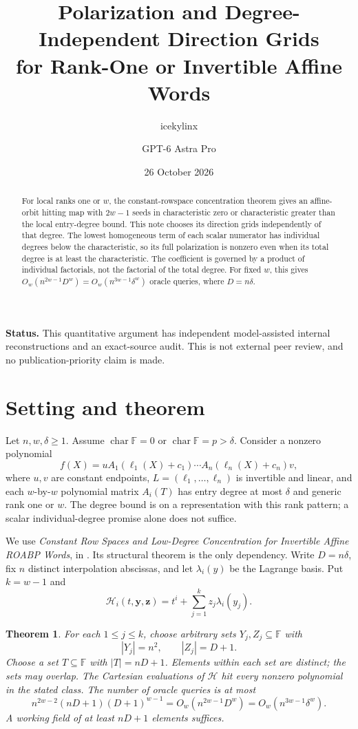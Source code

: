 \documentclass[11pt]{article}
\title{Polarization and Degree-Independent Direction Grids\\
for Rank-One or Invertible Affine Words}
\author{icekylinx \and GPT-6 Astra Pro}\date{26 October 2026}
\newtheorem{theorem}{Theorem}[section]
\newcommand{\F}{\mathbb F}
\begin{document}
\maketitle
\begin{abstract}
For local ranks one or \(w\), the constant-rowspace concentration
theorem gives an affine-orbit hitting map with \(2w-1\) seeds in
characteristic zero or characteristic greater than the local
entry-degree bound. This note chooses its direction grids
independently of that degree.
The lowest homogeneous term of each scalar numerator has individual
degrees below the characteristic, so its full polarization is nonzero
even when its total degree is at least the characteristic.
The coefficient is governed by a product of individual factorials,
not the factorial of the total degree.
For fixed \(w\), this gives
\(O_w(n^{2w-1}D^w)=O_w(n^{3w-1}\delta^w)\) oracle queries,
where \(D=n\delta\).
\end{abstract}

\noindent\textbf{Status.}
This quantitative argument has independent model-assisted internal
reconstructions and an exact-source audit. This is not external
peer review, and no publication-priority claim is made.

\section{Setting and theorem}

Let \(n,w,\delta\ge1\).
Assume \(\operatorname{char}\F=0\) or
\(\operatorname{char}\F=p>\delta\).
Consider a nonzero polynomial
\[
 f(X)=uA_1(\ell_1(X)+c_1)\cdots A_n(\ell_n(X)+c_n)v,
\]
where \(u,v\) are constant endpoints, \(L=(\ell_1,\ldots,\ell_n)\)
is invertible and linear, and each \(w\)-by-\(w\) polynomial matrix
\(A_i(T)\) has entry degree at most \(\delta\) and generic rank
one or \(w\).
The degree bound is on a representation with this rank pattern;
a scalar individual-degree promise alone does not suffice.

We use \emph{Constant Row Spaces and Low-Degree Concentration for
Invertible Affine ROABP Words}, in
.
Its structural theorem is the only dependency.
Write \(D=n\delta\), fix \(n\) distinct interpolation abscissas,
and let \(\lambda_i(y)\) be the Lagrange basis. Put \(k=w-1\) and
\[
 \mathcal H_i(t,\boldsymbol y,\boldsymbol z)
 =t^i+\sum_{j=1}^{k}z_j\lambda_i(y_j).
\]

\begin{theorem}\label{thm:grid}
For each \(1\le j\le k\), choose arbitrary sets \(Y_j,Z_j\subseteq\F\)
with
\[
 |Y_j|=n^2,\qquad |Z_j|=D+1.
\]
Choose a set \(T\subseteq\F\) with \(|T|=nD+1\).
Elements within each set are distinct; the sets may overlap.
The Cartesian evaluations of \(\mathcal H\) hit every nonzero
polynomial in the stated class.
The number of oracle queries is at most
\begin{equation}\label{eq:count}
 n^{2w-2}(nD+1)(D+1)^{w-1}
 =O_w(n^{2w-1}D^w)=O_w(n^{3w-1}\delta^w).
\end{equation}
A working field of at least \(nD+1\) elements suffices.
\end{theorem}
\end{document}
